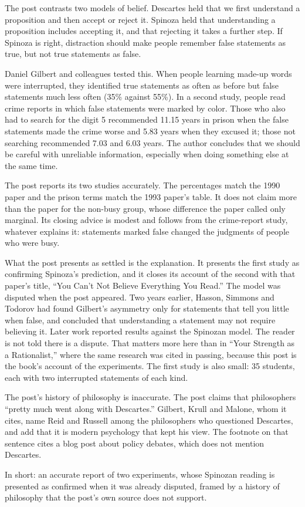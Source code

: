 \begin{afterword}
\summaryhead

The post contrasts two models of belief. Descartes held that we first understand a proposition and then accept or reject it. Spinoza held that understanding a proposition includes accepting it, and that rejecting it takes a further step. If Spinoza is right, distraction should make people remember false statements as true, but not true statements as false.

Daniel Gilbert and colleagues tested this. When people learning made-up words were interrupted, they identified true statements as often as before but false statements much less often (35\% against 55\%). In a second study, people read crime reports in which false statements were marked by color. Those who also had to search for the digit 5 recommended 11.15 years in prison when the false statements made the crime worse and 5.83 years when they excused it; those not searching recommended 7.03 and 6.03 years. The author concludes that we should be careful with unreliable information, especially when doing something else at the same time.

\responsehead

The post reports its two studies accurately. The percentages match the 1990 paper and the prison terms match the 1993 paper's table. It does not claim more than the paper for the non-busy group, whose difference the paper called only marginal. Its closing advice is modest and follows from the crime-report study, whatever explains it: statements marked false changed the judgments of people who were busy.

What the post presents as settled is the explanation. It presents the first study as confirming Spinoza's prediction, and it closes its account of the second with that paper's title, ``You Can't Not Believe Everything You Read.'' The model was disputed when the post appeared. Two years earlier, Hasson, Simmons and Todorov had found Gilbert's asymmetry only for statements that tell you little when false, and concluded that understanding a statement may not require believing it. Later work reported results against the Spinozan model. The reader is not told there is a dispute. That matters more here than in ``Your Strength as a Rationalist,'' where the same research was cited in passing, because this post is the book's account of the experiments. The first study is also small: 35 students, each with two interrupted statements of each kind.

The post's history of philosophy is inaccurate. The post claims that philosophers ``pretty much went along with Descartes.'' Gilbert, Krull and Malone, whom it cites, name Reid and Russell among the philosophers who questioned Descartes, and add that it is modern psychology that kept his view. The footnote on that sentence cites a blog post about policy debates, which does not mention Descartes.

In short: an accurate report of two experiments, whose Spinozan reading is presented as confirmed when it was already disputed, framed by a history of philosophy that the post's own source does not support.
\end{afterword}
